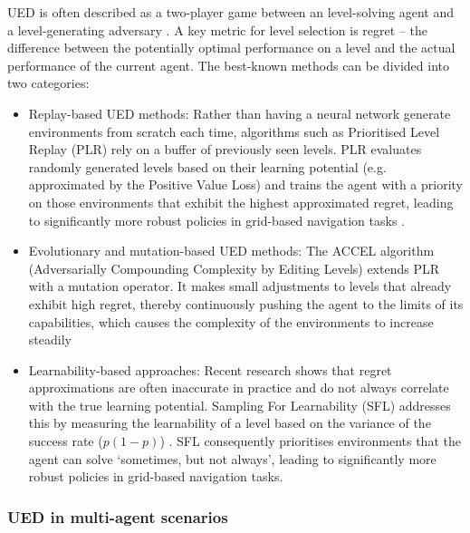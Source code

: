UED is often described as a two-player game between an level-solving agent and a level-generating adversary \cite{monette2025optimisationframeworkunsupervisedenvironment}. A key metric for level selection is regret \cite{dennis2020}– the difference between the potentially optimal performance on a level and the actual performance of the current agent. The best-known methods can be divided into two categories:
\begin{itemize}
    \item Replay-based UED methods: Rather than having a neural network generate environments from scratch each time, algorithms such as Prioritised Level Replay (PLR) \cite{JiangPLR2021} rely on a buffer of previously seen levels. PLR evaluates randomly generated levels based on their learning potential (e.g. approximated by the Positive Value Loss) and trains the agent with a priority on those environments that exhibit the highest approximated regret, leading to significantly more robust policies in grid-based navigation tasks \cite{parkerholder2023ACCEL}.

    \item Evolutionary and mutation-based UED methods: The ACCEL algorithm (Adversarially Compounding Complexity by Editing Levels) \cite{parkerholder2023ACCEL} extends PLR with a mutation operator. It makes small adjustments to levels that already exhibit high regret, thereby continuously pushing the agent to the limits of its capabilities, which causes the complexity of the environments to increase steadily

    \item Learnability-based approaches: Recent research shows that regret approximations are often inaccurate in practice and do not always correlate with the true learning potential. Sampling For Learnability (SFL) addresses this by measuring the learnability of a level based on the variance of the success rate ($p(1-p)$) \cite{rutherford2024sfl}. SFL consequently prioritises environments that the agent can solve ‘sometimes, but not always’, leading to significantly more robust policies in grid-based navigation tasks.

\end{itemize}





\subsubsection{UED in multi-agent scenarios}

